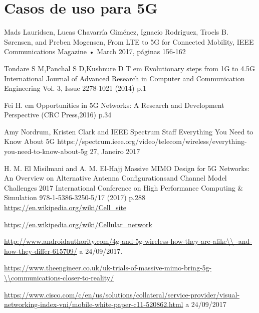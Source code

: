 \documentclass{llncs}
\begin{document}
\section{Casos de uso para 5G}

%
%
\begin{thebibliography}{10}

     Mads Lauridsen, Lucas Chavarría Giménez, Ignacio Rodriguez, Troels B. Sørensen, and Preben Mogensen, From LTE to 5G for Connected Mobility, IEEE Communications Magazine • March 2017, páginas 156-162

    Tondare S M,Panchal S D,Kushnure D T em
    Evolutionary steps from 1G to 4.5G
    International Journal of Advanced Research in Computer and Communication Engineering Vol. 3, Issue 2278-1021 (2014) p.1

    Fei H. em
    Opportunities in 5G Networks: A Research and Development Perspective (CRC Press,2016) p.34

    Amy Nordrum, Kristen Clark and IEEE Spectrum Staff
    Everything You Need to Know About 5G
    https://spectrum.ieee.org/video/telecom/wireless/everything-you-need-to-know-about-5g
    27, Janeiro 2017

    H. M. El Misilmani and A. M. El-Hajj
    Massive MIMO Design for 5G Networks: An Overview on Alternative Antenna Configurationsand Channel Model Challenges
    2017 International Conference on High Performance Computing \& Simulation
    978-1-5386-3250-5/17 (2017) p.288
    \url{https://en.wikipedia.org/wiki/Cell_site}

    \url{https://en.wikipedia.org/wiki/Cellular_network}

    \url{http://www.androidauthority.com/4g-and-5g-wireless-how-they-are-alike\\
    -and-how-they-differ-615709/} a 24/09/2017.

    \url{https://www.theengineer.co.uk/uk-trials-of-massive-mimo-bring-5g-\\communications-closer-to-reality/}

    \url{https://www.cisco.com/c/en/us/solutions/collateral/service-provider/visual-networking-index-vni/mobile-white-paper-c11-520862.html} a 24/09/2017
\end{thebibliography}
\end{document}
